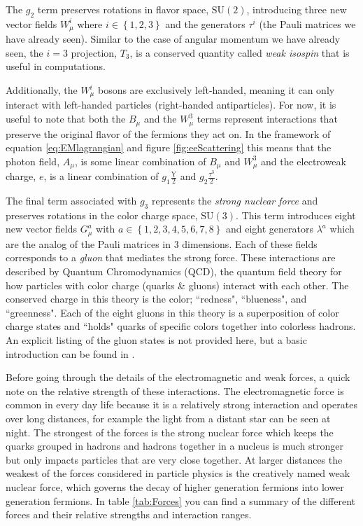 The $g_{2}$ term preserves rotations in flavor space, $\mathrm{SU}(2)$, introducing three new vector fields $W^{i}_{\mu}$ where $i \in \left\{1, 2, 3\right\}$ and the generators $\tau^{i}$ (the Pauli matrices we have already seen). Similar to the case of angular momentum we have already seen, the $i=3$ projection, $T_{3}$, is a conserved quantity called \textit{weak isospin} that is useful in computations.

Additionally, the $W^{i}_{\mu}$ bosons are exclusively left-handed, meaning it can only interact with left-handed particles (right-handed antiparticles). For now, it is useful to note that both the $B_{\mu}$ and the $W^{3}_{\mu}$ terms represent interactions that preserve the original flavor of the fermions they act on. In the framework of equation \eqref{eq:EMlagrangian} and figure \ref{fig:eeScattering} this means that the photon field, $A_{\mu}$, is some linear combination of $B_{\mu}$ and $W^{3}_{\mu}$ and the electroweak charge, $e$, is a linear combination of $g_{1} \frac{\mathrm{Y}}{2}$ and $g_{2} \frac{\tau^{3}}{2}$.

The final term associated with $g_{3}$ represents the \textit{strong nuclear force} and preserves rotations in the color charge space, $\mathrm{SU}(3)$. This term introduces eight new vector fields $G^{a}_{\mu}$ with $a \in \left\{1, 2, 3, 4, 5, 6, 7, 8\right\}$ and eight generators $\lambda^{a}$ which are the analog of the Pauli matrices in 3 dimensions. Each of these fields corresponds to a \textit{gluon} that mediates the strong force. These interactions are described by Quantum Chromodynamics (QCD), the quantum field theory for how particles with color charge (quarks \& gluons) interact with each other. The conserved charge in this theory is the color; ``redness", ``blueness", and ``greenness". Each of the eight gluons in this theory is a superposition of color charge states and ``holds" quarks of specific colors together into colorless hadrons. An explicit listing of the gluon states is not provided here, but a basic introduction can be found in \cite{Griffiths9:1987tj}.

Before going through the details of the electromagnetic and weak forces, a quick note on the relative strength of these interactions. The electromagnetic force is common in every day life because it is a relatively strong interaction and operates over long distances, for example the light from a distant star can be seen at night. The strongest of the forces is the strong nuclear force which keeps the quarks grouped in hadrons and hadrons together in a nucleus is much stronger but only impacts particles that are very close together. At larger distances the weakest of the forces considered in particle physics is the creatively named weak nuclear force, which governs the decay of higher generation fermions into lower generation fermions. In table \ref{tab:Forces} you can find a summary of the different forces and their relative strengths and interaction ranges.

